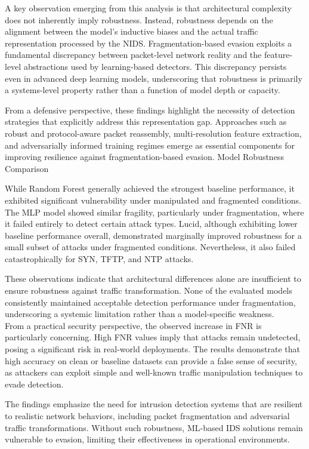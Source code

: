 A key observation emerging from this analysis is that architectural complexity does not inherently imply robustness. Instead, robustness depends on the alignment between the model’s inductive biases and the actual traffic representation processed by the NIDS. Fragmentation-based evasion exploits a fundamental discrepancy between packet-level network reality and the feature-level abstractions used by learning-based detectors. This discrepancy persists even in advanced deep learning models, underscoring that robustness is primarily a systems-level property rather than a function of model depth or capacity.

From a defensive perspective, these findings highlight the necessity of detection strategies that explicitly address this representation gap. Approaches such as robust and protocol-aware packet reassembly, multi-resolution feature extraction, and adversarially informed training regimes emerge as essential components for improving resilience against fragmentation-based evasion.
Model Robustness Comparison

While Random Forest generally achieved the strongest baseline performance, it exhibited significant vulnerability under manipulated and fragmented conditions. The MLP model showed similar fragility, particularly under fragmentation, where it failed entirely to detect certain attack types. Lucid, although exhibiting lower baseline performance overall, demonstrated marginally improved robustness for a small subset of attacks under fragmented conditions. Nevertheless, it also failed catastrophically for SYN, TFTP, and NTP attacks.

These observations indicate that architectural differences alone are insufficient to ensure robustness against traffic transformation. None of the evaluated models consistently maintained acceptable detection performance under fragmentation, underscoring a systemic limitation rather than a model-specific weakness.
\\

From a practical security perspective, the observed increase in FNR is particularly concerning. High FNR values imply that attacks remain undetected, posing a significant risk in real-world deployments. The results demonstrate that high accuracy on clean or baseline datasets can provide a false sense of security, as attackers can exploit simple and well-known traffic manipulation techniques to evade detection.

The findings emphasize the need for intrusion detection systems that are resilient to realistic network behaviors, including packet fragmentation and adversarial traffic transformations. Without such robustness, ML-based IDS solutions remain vulnerable to evasion, limiting their effectiveness in operational environments.

